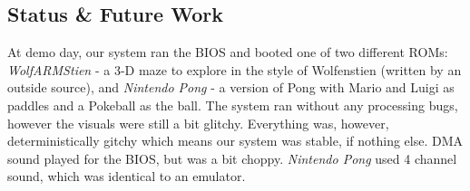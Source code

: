 \documentclass[11pt,a4paper]{article}
\begin{document}
	
	\subsection{Status \& Future Work}
	At demo day, our system ran the BIOS and booted one of two different ROMs: \textit{WolfARMStien} - a 3-D maze to explore in the style of Wolfenstien (written by an outside source), and \textit{Nintendo Pong} - a version of Pong with Mario and Luigi as paddles and a Pokeball as the ball. The system ran without any processing bugs, however the visuals were still a bit glitchy. Everything was, however, deterministically gitchy which means our system was stable, if nothing else. DMA sound played for the BIOS, but was a bit choppy. \textit{Nintendo Pong} used 4 channel sound, which was identical to an emulator.\\
	
	
\end{document}
